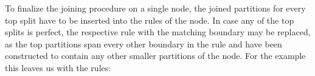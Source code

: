 To finalize the joining procedure on a single node, the joined partitions for every top split have to be inserted into the rules of the node. In case any of the top splits is perfect, the respective rule with the matching boundary may be replaced, as the top partitions span every other boundary in the rule and have been constructed to contain any other smaller partitions of the node. For the example this leaves us with the rules:
%
